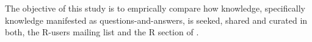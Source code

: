



The objective of this study is to emprically compare how knowledge, specifically knowledge manifested as questions-and-answers, is seeked, shared and curated in
both, the R-users mailing list and the R section of \SO.




